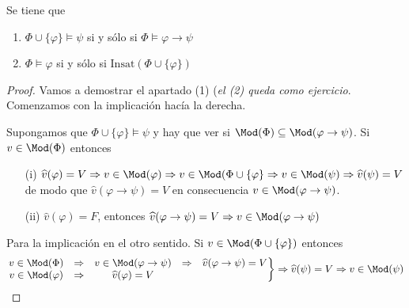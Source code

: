 \begin{prop} Se tiene que 
\begin{enumerate}
	\item $\Phi \cup \{ \varphi \} \models \psi$ si y sólo si $\Phi \models \varphi \rightarrow \psi$
	\item $\Phi \models \varphi$ si y sólo si $\textrm{Insat}(\Phi \cup \{\varphi\})$
\end{enumerate}
\end{prop}
\begin{proof}
Vamos a demostrar el apartado (1) (\textit{el (2) queda como ejercicio}. Comenzamos con la implicación hacía la derecha. 

Supongamos que $\Phi \cup \{\varphi\} \models \psi$ y hay que ver si $\Mod (\Phi) \subseteq \Mod (\varphi \rightarrow \psi)$. Si $v \in \Mod (\Phi)$ entonces 
\begin{itemize}
	\item[(i)] $\widehat{v}(\varphi)=V \Rightarrow v \in \Mod(\varphi) \Rightarrow v \in \Mod (\Phi \cup\{\varphi\} \Rightarrow v \in \Mod (\psi) \Rightarrow \widehat{v}(\psi)=V$ de modo que $\widehat{v}(\varphi \rightarrow \psi)=V$ en consecuencia $v \in \Mod (\varphi \rightarrow \psi)$.
	\item[(ii)] $\widehat{v}(\varphi)=F$, entonces $\widehat{v}(\varphi \rightarrow \psi)=V \Rightarrow v \in \Mod (\varphi \rightarrow \psi)$ 
\end{itemize}

Para la implicación en el otro sentido. Si $v \in \Mod(\Phi \cup \{ \varphi \})$ entonces 
\[ \left. \begin{matrix}
v \in \Mod (\Phi) &\Rightarrow & v \in \Mod (\varphi \rightarrow \psi) &\Rightarrow & \widehat{v}(\varphi \rightarrow \psi)=V\\
v \in \Mod (\varphi) &\Rightarrow & \widehat{v}(\varphi)=V
\end{matrix} \right \rbrace \Rightarrow \widehat{v}(\psi)=V \Rightarrow v \in \Mod(\psi) \] 
\end{proof}